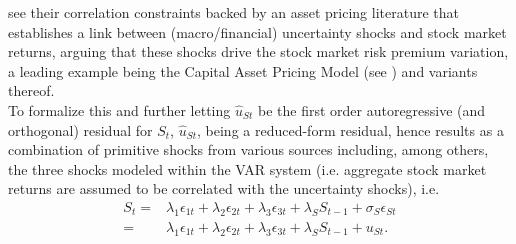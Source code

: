 \documentclass[a4paper,11pt,listof=nochaptergap,oneside,pointednumbers,bibtotoc,bigheadings,liststotoc,hidelinks]{scrbook}
\theoremstyle{mysatz}
\theoremstyle{mydefinition}
\theoremstyle{mytheorem}
\theoremstyle{mybemerkung}
\begin{document}
\citet{ludvigsonetal:18} see their correlation constraints backed by an asset pricing literature that establishes a link between (macro/financial) uncertainty shocks and stock market returns, arguing that these shocks drive the stock market risk premium variation, a leading example being the Capital Asset Pricing Model (see \citealp{sharpe:64, lintner:65}) and variants thereof.\\

To formalize this and further letting $\hat{u}_{St}$ be the first order autoregressive (and orthogonal) residual for $S_t$, $\hat{u}_{St}$, being a reduced-form residual, hence results as a combination of primitive shocks from various sources including, among others, the three shocks modeled within the VAR system (i.e. aggregate stock market returns are assumed to be correlated with the uncertainty shocks), i.e. 
	\begin{equation} \label{eq:svar_ludvig15}
		\begin{split}
S_t = & \lambda_1 \epsilon_{1t} + \lambda_2 \epsilon_{2t} + \lambda_3 \epsilon_{3t} + \lambda_S S_{t-1} + \sigma_S \epsilon_{St} \\
	= &  \lambda_1 \epsilon_{1t} + \lambda_2 \epsilon_{2t} + \lambda_3 \epsilon_{3t} + \lambda_S S_{t-1} +  u_{St}.
	     	\end{split}				
	\end{equation}	
\end{document}
